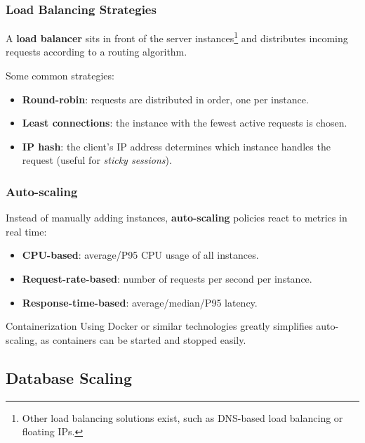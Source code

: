 \documentclass{beamer}
\begin{document}
\begin{frame}
  \frametitle{Load Balancing Strategies}

  A \textbf{load balancer} sits in front of the server instances\footnote{Other load balancing solutions exist, such as DNS-based load balancing or floating IPs.} and distributes incoming requests according to a routing algorithm.
  \newline

  Some common strategies:

  \begin{itemize}
    \item \textbf{Round-robin}: requests are distributed in order, one per instance.
    \item \textbf{Least connections}: the instance with the fewest active requests is chosen.
    \item \textbf{IP hash}: the client's IP address determines which instance handles the request
      (useful for \textit{sticky sessions}).
  \end{itemize}

\end{frame}

\begin{frame}
  \frametitle{Auto-scaling}

  Instead of manually adding instances, \textbf{auto-scaling} policies react to metrics
  in real time:

  \begin{itemize}
    \item \textbf{CPU-based}: average/P95 CPU usage of all instances.
    \item \textbf{Request-rate-based}: number of requests per second per instance.
    \item \textbf{Response-time-based}: average/median/P95 latency.
  \end{itemize}

  \begin{block}{Containerization}
    Using Docker or similar technologies greatly simplifies auto-scaling, as containers can be started and stopped easily.
  \end{block}

\end{frame}

\subsection{Database Scaling}
\end{document}
